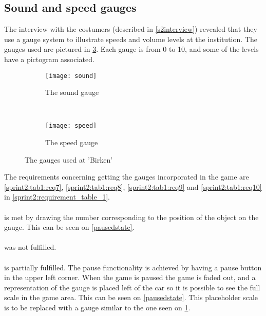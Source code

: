 \subsection{Sound and speed gauges}\label{sprint2:gauges}
The interview with the costumers (described in \cref{s2interview}) revealed that they use a gauge system to illustrate speeds and volume levels at the institution. 
The gauges used are pictured in \cref{gauges}.
Each gauge is from 0 to 10, and some of the levels have a pictogram associated.

\begin{figure}[h]
	\centering
        \begin{subfigure}[b]{0.5\textwidth}
                \texttt{[image: sound]}
                \caption{The sound gauge}
                \label{soundgauge}
        \end{subfigure}%
        ~
        \begin{subfigure}[b]{0.5\textwidth}
                \texttt{[image: speed]}
                \caption{The speed gauge}
                \label{speedgauge}
        \end{subfigure}
        \caption{The gauges used at 'Birken'}\label{fig:animals}
        \label{gauges}
\end{figure}

The requirements concerning getting the gauges incorporated in the game are \cref{sprint2:tab1:req7}, \cref{sprint2:tab1:req8}, \cref{sprint2:tab1:req9} and \cref{sprint2:tab1:req10} in \cref{sprint2:requirement_table_1}.

\paragraph{} is met by drawing the number corresponding to the position of the object on the gauge. 
This can be seen on \cref{pausedstate}.

\paragraph{} was not fulfilled.

\paragraph{} is partially fulfilled.
The pause functionality is achieved by having a pause button in the upper left corner. 
When the game is paused the game is faded out, and a representation of the gauge is placed left of the car so it is possible to see the full scale in the game area.
This can be seen on \cref{pausedstate}.
This placeholder scale is to be replaced with a gauge similar to the one seen on \cref{soundgauge}.

